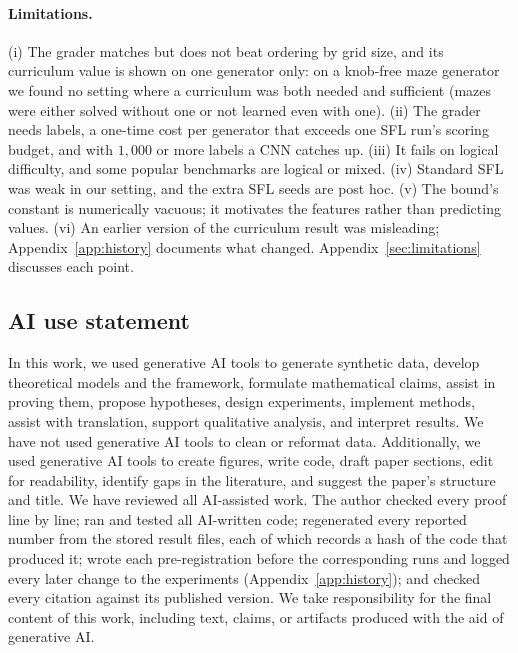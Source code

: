 \documentclass[twoside]{article}
\begin{document}
\paragraph{Limitations.}
\label{sec:limitations-main}
(i) The grader matches but does not beat ordering by grid size, and its curriculum value is shown on one generator only: on a knob-free maze generator we found no setting where a curriculum was both needed and sufficient (mazes were either solved without one or not learned even with one). (ii) The grader needs labels, a one-time cost per generator that exceeds one SFL run's scoring budget, and with $1{,}000$ or more labels a CNN catches up. (iii) It fails on logical difficulty, and some popular benchmarks are logical or mixed. (iv) Standard SFL was weak in our setting, and the extra SFL seeds are post hoc. (v) The bound's constant is numerically vacuous; it motivates the features rather than predicting values. (vi) An earlier version of the curriculum result was misleading; Appendix~\ref{app:history} documents what changed. Appendix~\ref{sec:limitations} discusses each point.

\subsection*{AI use statement}

In this work, we used generative AI tools to generate synthetic data, develop theoretical models and the framework, formulate mathematical claims, assist in proving them, propose hypotheses, design experiments, implement methods, assist with translation, support qualitative analysis, and interpret results. We have not used generative AI tools to clean or reformat data. Additionally, we used generative AI tools to create figures, write code, draft paper sections, edit for readability, identify gaps in the literature, and suggest the paper's structure and title.
We have reviewed all AI-assisted work. The author checked every proof line by line; ran and tested all AI-written code; regenerated every reported number from the stored result files, each of which records a hash of the code that produced it; wrote each pre-registration before the corresponding runs and logged every later change to the experiments (Appendix~\ref{app:history}); and checked every citation against its published version.
We take responsibility for the final content of this work, including text, claims, or artifacts produced with the aid of generative AI.

\end{document}
